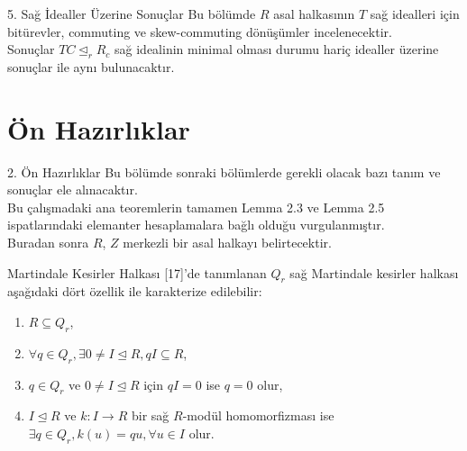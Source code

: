 \documentclass{beamer}
\begin{document}
\begin{frame}

\begin{block}{5. Sağ İdealler Üzerine Sonuçlar}
Bu bölümde $R$ asal halkasının $T$ sağ idealleri için bitürevler, commuting ve skew-commuting dönüşümler incelenecektir.\\
Sonuçlar $TC \trianglelefteq_r R_c$ sağ idealinin minimal olması durumu hariç idealler üzerine sonuçlar ile aynı bulunacaktır.
\end{block}

\end{frame}

\section{Ön Hazırlıklar}

\begin{frame}{2. Ön Hazırlıklar}
Bu bölümde sonraki bölümlerde gerekli olacak bazı tanım ve sonuçlar ele alınacaktır.\\
Bu çalışmadaki ana teoremlerin tamamen Lemma 2.3 ve Lemma 2.5 ispatlarındaki elemanter hesaplamalara bağlı olduğu vurgulanmıştır.\\
Buradan sonra $R$, $Z$ merkezli bir asal halkayı belirtecektir.
\end{frame}

\begin{frame}

\begin{block}{Martindale Kesirler Halkası}
[17]'de tanımlanan $Q_r$ sağ Martindale kesirler halkası aşağıdaki dört özellik ile karakterize edilebilir:
\begin{enumerate}
    \item $R \subseteq Q_r$,
    \item $\forall q \in Q_r, \exists 0 \neq I \trianglelefteq R, qI \subseteq R$,
    \item $q \in Q_r$ ve $0 \neq I \trianglelefteq R$ için $qI = 0$ ise $q = 0$ olur,
    \item $I \trianglelefteq R$ ve $k \colon I \to R$ bir sağ $R$-modül homomorfizması ise $\exists q \in Q_r, k(u) = qu, \forall u \in I$ olur. 
\end{enumerate}
\end{block}
    
\end{frame}
\end{document}
